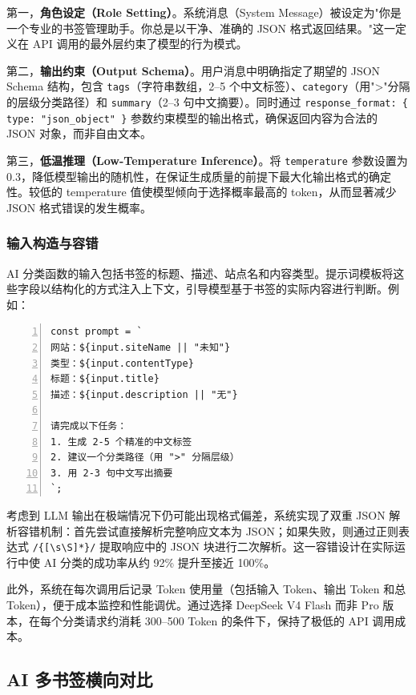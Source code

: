 \documentclass[12pt,a4paper]{ctexart}
\begin{document}
第一，\textbf{角色设定（Role Setting）}。系统消息（System Message）被设定为"你是一个专业的书签管理助手。你总是以干净、准确的 JSON 格式返回结果。"这一定义在 API 调用的最外层约束了模型的行为模式。

第二，\textbf{输出约束（Output Schema）}。用户消息中明确指定了期望的 JSON Schema 结构，包含 \texttt{tags}（字符串数组，2--5 个中文标签）、\texttt{category}（用">"分隔的层级分类路径）和 \texttt{summary}（2--3 句中文摘要）。同时通过 \texttt{response\_format: \{ type: "json\_object" \}} 参数约束模型的输出格式，确保返回内容为合法的 JSON 对象，而非自由文本。

第三，\textbf{低温推理（Low-Temperature Inference）}。将 \texttt{temperature} 参数设置为 0.3，降低模型输出的随机性，在保证生成质量的前提下最大化输出格式的确定性。较低的 temperature 值使模型倾向于选择概率最高的 token，从而显著减少 JSON 格式错误的发生概率。

\subsubsection{输入构造与容错}

AI 分类函数的输入包括书签的标题、描述、站点名和内容类型。提示词模板将这些字段以结构化的方式注入上下文，引导模型基于书签的实际内容进行判断。例如：

\begin{lstlisting}[basicstyle=\ttfamily\small, caption={AI 分类提示词构造}, frame=single, numbers=left]
const prompt = `
网站：${input.siteName || "未知"}
类型：${input.contentType}
标题：${input.title}
描述：${input.description || "无"}

请完成以下任务：
1. 生成 2-5 个精准的中文标签
2. 建议一个分类路径（用 ">" 分隔层级）
3. 用 2-3 句中文写出摘要
`;
\end{lstlisting}

考虑到 LLM 输出在极端情况下仍可能出现格式偏差，系统实现了双重 JSON 解析容错机制：首先尝试直接解析完整响应文本为 JSON；如果失败，则通过正则表达式 \texttt{/\{[\textbackslash s\textbackslash S]*\}/} 提取响应中的 JSON 块进行二次解析。这一容错设计在实际运行中使 AI 分类的成功率从约 92\% 提升至接近 100\%。

此外，系统在每次调用后记录 Token 使用量（包括输入 Token、输出 Token 和总 Token），便于成本监控和性能调优。通过选择 DeepSeek V4 Flash 而非 Pro 版本，在每个分类请求约消耗 300--500 Token 的条件下，保持了极低的 API 调用成本。

\subsection{AI 多书签横向对比}
\end{document}
